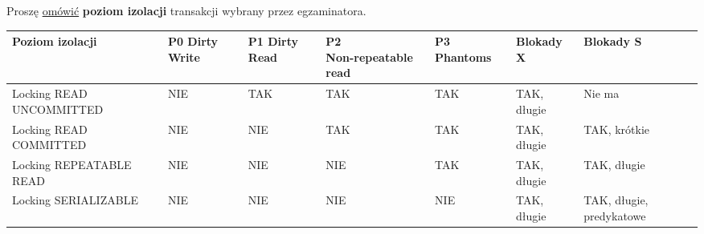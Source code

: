 \horrule{0.5pt}
Proszę \underline{omówić} \textbf{poziom izolacji} transakcji wybrany przez
egzaminatora.\\
\horrule{0.5pt}

\vskip 1cm

\begin{adjustbox}{width=\columnwidth,center}
    \begin{tabular}{|p{3cm}|p{1cm}|p{1cm}|p{2cm}|p{1cm}|p{1.3cm}|p{1.3cm}|}
        \hline
        \vskip 0.1cm
        \textbf{Poziom izolacji} &
        \textbf{P0 Dirty Write} &
        \textbf{P1 Dirty Read} &
        \textbf{P2 \newline Non-repeatable read} &
        \textbf{P3 Phantoms} &
        \textbf{Blokady X} &
        \textbf{Blokady S}\\
        \hline
        Locking READ \newline UNCOMMITTED &
        \cellcolor{red!25} NIE &
        \cellcolor{green!25} TAK &
        \cellcolor{green!25} TAK &
        \cellcolor{green!25} TAK &
        \cellcolor{yellow!25} TAK, długie &
        Nie ma\\
        \hline
        Locking READ \newline COMMITTED &
        \cellcolor{red!25} NIE &
        \cellcolor{red!25} NIE &
        \cellcolor{green!25} TAK &
        \cellcolor{green!25} TAK &
        \cellcolor{yellow!25} TAK, długie &
        \cellcolor{cyan!15} TAK, krótkie\\
        \hline
        Locking REPEATABLE READ &
        \cellcolor{red!25} NIE &
        \cellcolor{red!25} NIE &
        \cellcolor{red!25} NIE &
        \cellcolor{green!25} TAK &
        \cellcolor{yellow!25} TAK, długie &
        \cellcolor{yellow!25} TAK, długie\\
        \hline
        Locking \newline SERIALIZABLE &
        \cellcolor{red!25} NIE &
        \cellcolor{red!25} NIE &
        \cellcolor{red!25} NIE &
        \cellcolor{red!25} NIE &
        \cellcolor{yellow!25} TAK, długie &
        \cellcolor{blue!25} TAK, długie, predykatowe\\
        \hline

    \end{tabular}
\end{adjustbox}
\vskip 1cm

